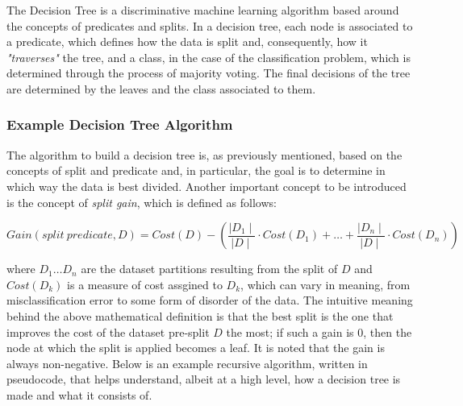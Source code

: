 The Decision Tree is a discriminative machine learning algorithm based around the concepts of predicates and splits.
In a decision tree, each node is associated to a predicate, which defines how the data is split and, consequently, how it \textit{"traverses"} the tree, and a class, in the case of the classification problem, which is determined through the process of majority voting. The final decisions of the tree are determined by the leaves and the class associated to them.

\subsubsection{Example Decision Tree Algorithm}

The algorithm to build a decision tree is, as previously mentioned, based on the concepts of split and predicate and, in particular, the goal is to determine in which way the data is best divided. Another important concept to be introduced is the concept of \textit{split gain}, which is defined as follows:

$$
Gain(split\ predicate, D) = Cost(D) - \left(\frac{\mid D_1 \mid}{\mid D \mid} \cdot Cost(D_1) + \dots + \frac{\mid D_n \mid}{\mid D \mid} \cdot Cost(D_n)\right)
$$

where $D_1 \dots D_n$ are the dataset partitions resulting from the split of $D$ and $Cost(D_k)$ is a measure of cost assgined to $D_k$, which can vary in meaning, from misclassification error to some form of disorder of the data. The intuitive meaning behind the above mathematical definition is that the best split is the one that improves the cost of the dataset pre-split $D$ the most; if such a gain is $0$, then the node at which the split is applied becomes a leaf. It is noted that the gain is always non-negative.
Below is an example recursive algorithm, written in pseudocode, that helps understand, albeit at a high level, how a decision tree is made and what it consists of.

